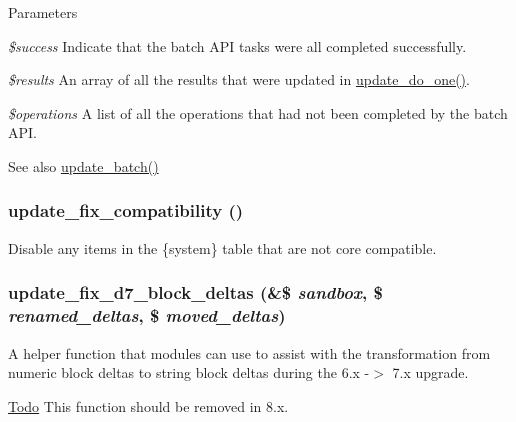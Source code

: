 \begin{DoxyParams}{Parameters}
\item[{\em \$success}]Indicate that the batch API tasks were all completed successfully. \item[{\em \$results}]An array of all the results that were updated in \hyperlink{update_8inc_ac46854f64e50a81361ed8816b8f0ce7e}{update\_\-do\_\-one()}. \item[{\em \$operations}]A list of all the operations that had not been completed by the batch API.\end{DoxyParams}
\begin{DoxySeeAlso}{See also}
\hyperlink{update_8inc_aa4dd3d84e553f6bf25ad19608152d5b7}{update\_\-batch()} 
\end{DoxySeeAlso}
\hypertarget{update_8inc_ab86cb0f00b89fc52f7f6294be9a1e33c}{
\subsubsection[{update\_\-fix\_\-compatibility}]{\setlength{\rightskip}{0pt plus 5cm}update\_\-fix\_\-compatibility ()}}
\label{update_8inc_ab86cb0f00b89fc52f7f6294be9a1e33c}
Disable any items in the \{system\} table that are not core compatible. \hypertarget{update_8inc_a349ad25ac5547fbb44556538758988a2}{
\subsubsection[{update\_\-fix\_\-d7\_\-block\_\-deltas}]{\setlength{\rightskip}{0pt plus 5cm}update\_\-fix\_\-d7\_\-block\_\-deltas (\&\$ {\em sandbox}, \/  \$ {\em renamed\_\-deltas}, \/  \$ {\em moved\_\-deltas})}}
\label{update_8inc_a349ad25ac5547fbb44556538758988a2}
A helper function that modules can use to assist with the transformation from numeric block deltas to string block deltas during the 6.x -\/$>$ 7.x upgrade.

\begin{Desc}
\item[\hyperlink{todo__todo000007}{Todo}]This function should be removed in 8.x.\end{Desc}

